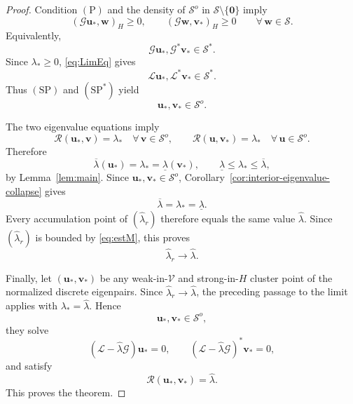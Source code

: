 \documentclass[10pt,a4paper]{amsart}
\begin{document}
\begin{proof}
	Condition \(\mathrm{(P)}\) and the density of
	\(\mathcal S^o\) in \(\mathcal S\setminus\{\mathbf0\}\) imply
	\[
	(\mathcal G\mathbf u_*,\mathbf w)_H\ge0,
	\qquad
	(\mathcal G\mathbf w,\mathbf v_*)_H\ge0
	\qquad
	\forall\,\mathbf w\in\mathcal S.
	\]
	Equivalently,
	\[
	\mathcal G\mathbf u_*,
	\mathcal G^*\mathbf v_*
	\in
	\mathcal S^*.
	\]
	Since \(\lambda_*\ge0\), \eqref{eq:LimEq} gives
	\[
	\mathcal L\mathbf u_*,
	\mathcal L^*\mathbf v_*
	\in
	\mathcal S^*.
	\]
	Thus \(\mathrm{(SP)}\) and \(\mathrm{(SP^*)}\) yield
	\[
	\mathbf u_*,\mathbf v_*\in\mathcal S^o.
	\]
	
	The two eigenvalue equations imply
	\[
	\mathcal R(\mathbf u_*,\mathbf v)=\lambda_*
	\quad
	\forall\,\mathbf v\in\mathcal S^o,
	\qquad
	\mathcal R(\mathbf u,\mathbf v_*)=\lambda_*
	\quad
	\forall\,\mathbf u\in\mathcal S^o.
	\]
	Therefore
	\begin{equation}\label{eq:limit-quasi-pair}
		\overline\lambda(\mathbf u_*)
		=
		\lambda_*
		=
		\underline\lambda(\mathbf v_*),
		\qquad
		\underline\lambda\le\lambda_*\le\overline\lambda,
	\end{equation}
	by Lemma~\ref{lem:main}. Since
	\(\mathbf u_*,\mathbf v_*\in\mathcal S^o\),
	Corollary~\ref{cor:interior-eigenvalue-collapse} gives
	\[
	\overline\lambda
	=
	\lambda_*
	=
	\underline\lambda.
	\]
	Every accumulation point of \((\hat\lambda_r)\) therefore equals the same
	value \(\hat\lambda\). Since \((\hat\lambda_r)\) is bounded by
	\eqref{eq:estM}, this proves
	\[
	\hat\lambda_r\to\hat\lambda.
	\]
	
	Finally, let \((\mathbf u_*,\mathbf v_*)\) be any weak-in-\(\mathcal V\) and
	strong-in-\(H\) cluster point of the normalized discrete eigenpairs. Since
	\(\hat\lambda_r\to\hat\lambda\), the preceding passage to the limit applies
	with \(\lambda_*=\hat\lambda\). Hence
	\[
	\mathbf u_*,\mathbf v_*
	\in
	\mathcal S^o,
	\]
	they solve
	\[
	(\mathcal L-\hat\lambda\mathcal G)\mathbf u_*=0,
	\qquad
	(\mathcal L-\hat\lambda\mathcal G)^*\mathbf v_*=0,
	\]
	and satisfy
	\[
	\mathcal R(\mathbf u_*,\mathbf v_*)=\hat\lambda.
	\]
	This proves the theorem.
\end{proof}
\end{document}

